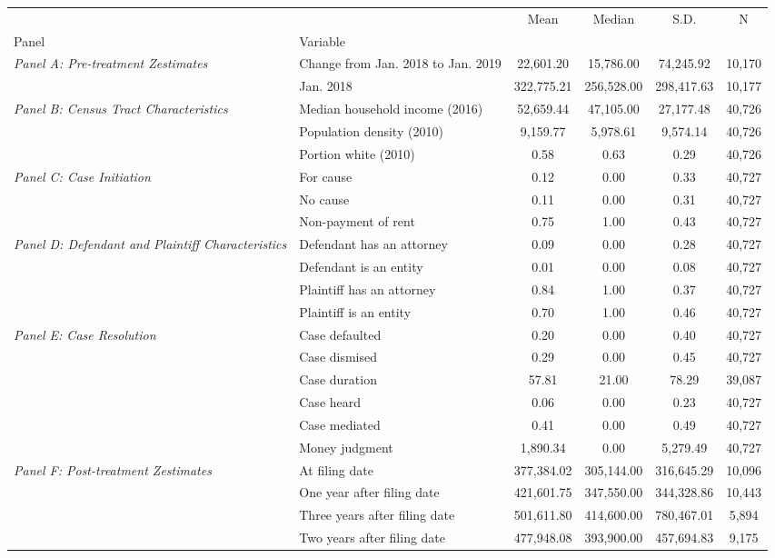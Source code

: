 \begin{tabular}{llcccc}
\toprule
 &  & Mean & Median & S.D. & N \\
Panel & Variable &  &  &  &  \\
\midrule
\multirow[c]{2}{3cm}{\textit{Panel A: Pre-treatment Zestimates}} & Change from Jan. 2018 to Jan. 2019 & 22,601.20 & 15,786.00 & 74,245.92 & 10,170 \\
 & Jan. 2018 & 322,775.21 & 256,528.00 & 298,417.63 & 10,177 \\
\cline{1-6}
\multirow[c]{3}{3cm}{\textit{Panel B: Census Tract Characteristics}} & Median household income (2016) & 52,659.44 & 47,105.00 & 27,177.48 & 40,726 \\
 & Population density (2010) & 9,159.77 & 5,978.61 & 9,574.14 & 40,726 \\
 & Portion white (2010) & 0.58 & 0.63 & 0.29 & 40,726 \\
\cline{1-6}
\multirow[c]{3}{3cm}{\textit{Panel C: Case Initiation}} & For cause & 0.12 & 0.00 & 0.33 & 40,727 \\
 & No cause & 0.11 & 0.00 & 0.31 & 40,727 \\
 & Non-payment of rent & 0.75 & 1.00 & 0.43 & 40,727 \\
\cline{1-6}
\multirow[c]{4}{3cm}{\textit{Panel D: Defendant and Plaintiff Characteristics}} & Defendant has an attorney & 0.09 & 0.00 & 0.28 & 40,727 \\
 & Defendant is an entity & 0.01 & 0.00 & 0.08 & 40,727 \\
 & Plaintiff has an attorney & 0.84 & 1.00 & 0.37 & 40,727 \\
 & Plaintiff is an entity & 0.70 & 1.00 & 0.46 & 40,727 \\
\cline{1-6}
\multirow[c]{6}{3cm}{\textit{Panel E: Case Resolution}} & Case defaulted & 0.20 & 0.00 & 0.40 & 40,727 \\
 & Case dismised & 0.29 & 0.00 & 0.45 & 40,727 \\
 & Case duration & 57.81 & 21.00 & 78.29 & 39,087 \\
 & Case heard & 0.06 & 0.00 & 0.23 & 40,727 \\
 & Case mediated & 0.41 & 0.00 & 0.49 & 40,727 \\
 & Money judgment & 1,890.34 & 0.00 & 5,279.49 & 40,727 \\
\cline{1-6}
\multirow[c]{4}{3cm}{\textit{Panel F: Post-treatment Zestimates}} & At filing date & 377,384.02 & 305,144.00 & 316,645.29 & 10,096 \\
 & One year after filing date & 421,601.75 & 347,550.00 & 344,328.86 & 10,443 \\
 & Three years after filing date & 501,611.80 & 414,600.00 & 780,467.01 & 5,894 \\
 & Two years after filing date & 477,948.08 & 393,900.00 & 457,694.83 & 9,175 \\
\cline{1-6}
\bottomrule
\end{tabular}

